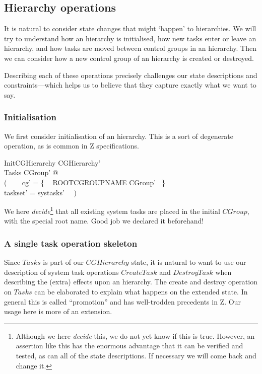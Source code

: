 \documentclass[a4paper,twoside,12pt]{article}
\begin{document}
\subsection{Hierarchy operations}

It is natural to consider state changes that might `happen' to hierarchies.
We will try to understand how an hierarchy is initialised, how new tasks enter or leave an hierarchy, 
and how tasks are moved between control groups in an hierarchy.
Then we can consider how a new control group of an hierarchy is created or destroyed.

Describing each of these operations precisely challenges our state descriptions and constraints---which helps us
to believe that they capture exactly what we want to say.

\subsubsection{Initialisation}

We first consider initialisation of an hierarchy. This is a sort of degenerate operation, as is common in Z specifications.

\begin{schema}{InitCGHierarchy}
CGHierarchy' \\
\Xi Tasks
\where
\exists CGroup' @ \\
( ~~~ cg' = \{ ~ ROOTCGROUPNAME \mapsto \theta CGroup' ~\} \\
\land taskset' = systasks' ~~)
\end{schema}
We here \emph{decide}\footnote{Although we here \emph{decide} this, 
we do not yet know if this is true. However, an assertion like this has the enormous advantage that it can be verified 
and tested, as can all of the state descriptions. If necessary we will come back and change it.}
that all existing system tasks are placed in the initial $CGroup$, 
with the special root name. 
Good job we declared it beforehand!

\subsubsection{A single task operation skeleton}

Since $Tasks$ is part of our $CGHierarchy$ state, it is natural to want to use our description of system task operations $CreateTask$ 
and $DestroyTask$ when describing the (extra) effects upon an hierarchy. The create and destroy operation on
$Tasks$ can be elaborated to explain what happens on the extended state. 
In general this is called ``promotion'' and has well-trodden precedents in Z. Our usage here is more of an extension.
\end{document}
